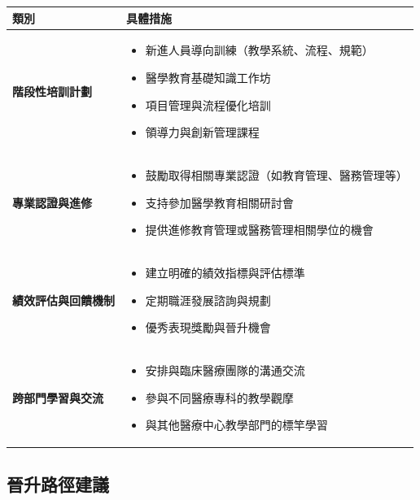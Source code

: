 \documentclass[12pt,a4paper]{article}
\begin{document}
\begin{longtable}{P{4cm}P{12cm}}
\toprule
\textbf{類別} & \textbf{具體措施} \\
\midrule
\endhead

\textbf{階段性培訓計劃} &
\begin{itemize}[leftmargin=*,itemsep=1pt,parsep=0pt]
  \item 新進人員導向訓練（教學系統、流程、規範）
  \item 醫學教育基礎知識工作坊
  \item 項目管理與流程優化培訓
  \item 領導力與創新管理課程
\end{itemize} \\
\midrule

\textbf{專業認證與進修} &
\begin{itemize}[leftmargin=*,itemsep=1pt,parsep=0pt]
  \item 鼓勵取得相關專業認證（如教育管理、醫務管理等）
  \item 支持參加醫學教育相關研討會
  \item 提供進修教育管理或醫務管理相關學位的機會
\end{itemize} \\
\midrule

\textbf{績效評估與回饋機制} &
\begin{itemize}[leftmargin=*,itemsep=1pt,parsep=0pt]
  \item 建立明確的績效指標與評估標準
  \item 定期職涯發展諮詢與規劃
  \item 優秀表現獎勵與晉升機會
\end{itemize} \\
\midrule

\textbf{跨部門學習與交流} &
\begin{itemize}[leftmargin=*,itemsep=1pt,parsep=0pt]
  \item 安排與臨床醫療團隊的溝通交流
  \item 參與不同醫療專科的教學觀摩
  \item 與其他醫療中心教學部門的標竿學習
\end{itemize} \\
\bottomrule

\end{longtable}

\subsection{晉升路徑建議}
\end{document}
